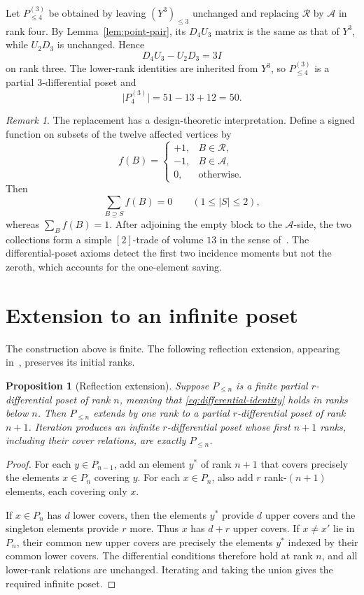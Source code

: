 \documentclass[11pt,a4paper]{amsart}
\newtheorem{proposition}[theorem]{Proposition}
\theoremstyle{definition}
\theoremstyle{remark}
\newtheorem{remark}[theorem]{Remark}
\newcommand{\card}[1]{\lvert #1\rvert}
\newcommand{\Rcal}{\mathcal{R}}
\newcommand{\Acal}{\mathcal{A}}
\begin{document}
Let $P^{(3)}_{\leq4}$ be obtained by leaving $(Y^3)_{\leq3}$ unchanged and replacing $\Rcal$ by $\Acal$ in rank four. By Lemma~\ref{lem:point-pair}, its $D_4U_3$ matrix is the same as that of $Y^3$, while $U_2D_3$ is unchanged. Hence
\[
  D_4U_3-U_2D_3=3I
\]
on rank three. The lower-rank identities are inherited from $Y^3$, so $P^{(3)}_{\leq4}$ is a partial $3$-differential poset and
\[
  \card{P^{(3)}_4}=51-13+12=50.
\]

\begin{remark}\label{rem:trade}
The replacement has a design-theoretic interpretation. Define a signed function on subsets of the twelve affected vertices by
\[
  f(B)=
  \begin{cases}
    +1,&B\in\Rcal,\\
    -1,&B\in\Acal,\\
    0,&\text{otherwise}.
  \end{cases}
\]
Then
\[
  \sum_{B\supseteq S}f(B)=0
  \qquad(1\leq\card{S}\leq2),
\]
whereas $\sum_Bf(B)=1$. After adjoining the empty block to the $\Acal$-side, the two collections form a simple $[2]$-trade of volume $13$ in the sense of~\cite{GhorbaniEtAl2020}. The differential-poset axioms detect the first two incidence moments but not the zeroth, which accounts for the one-element saving.
\end{remark}

\section{Extension to an infinite poset}\label{sec:extension}

The construction above is finite. The following reflection extension, appearing in~\cite[Proposition~6.1]{Stanley1988}, preserves its initial ranks.

\begin{proposition}[Reflection extension]\label{prop:reflection-extension}
Suppose $P_{\leq n}$ is a finite partial $r$-differential poset of rank $n$, meaning that \eqref{eq:differential-identity} holds in ranks below $n$. Then $P_{\leq n}$ extends by one rank to a partial $r$-differential poset of rank $n+1$. Iteration produces an infinite $r$-differential poset whose first $n+1$ ranks, including their cover relations, are exactly $P_{\leq n}$.
\end{proposition}

\begin{proof}
For each $y\in P_{n-1}$, add an element $y^*$ of rank $n+1$ that covers precisely the elements $x\in P_n$ covering $y$. For each $x\in P_n$, also add $r$ rank-$(n+1)$ elements, each covering only $x$.

If $x\in P_n$ has $d$ lower covers, then the elements $y^*$ provide $d$ upper covers and the singleton elements provide $r$ more. Thus $x$ has $d+r$ upper covers. If $x\neq x'$ lie in $P_n$, their common new upper covers are precisely the elements $y^*$ indexed by their common lower covers. The differential conditions therefore hold at rank $n$, and all lower-rank relations are unchanged. Iterating and taking the union gives the required infinite poset.
\end{proof}
\end{document}
